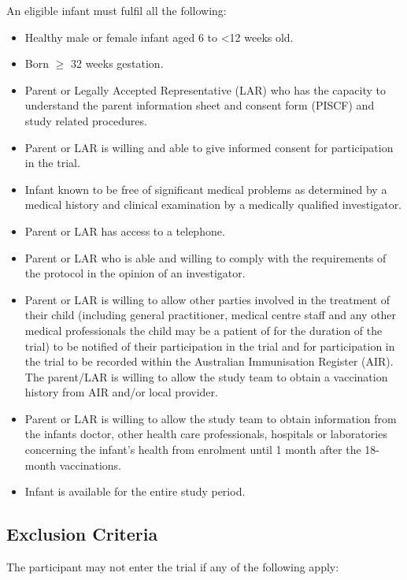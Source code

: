 \documentclass{bmcart}
\begin{document}
An eligible infant must fulfil all the following:

\begin{itemize}
	\item Healthy male or female infant aged 6 to \textless12 weeks old.
	\item Born $\geq$ 32 weeks gestation.
	\item
	Parent or Legally Accepted Representative (LAR) who has the capacity to understand the parent information sheet and consent form (PISCF) and study related procedures.
	\item Parent or LAR is willing and able to give informed consent for participation in the trial.
	\item Infant known to be free of significant medical problems as determined by a medical history and clinical examination by a medically qualified investigator.
	\item Parent or LAR has access to a telephone.
	\item Parent or LAR who is able and willing to comply with the requirements of the protocol in the opinion of an investigator.
	\item Parent or LAR is willing to allow other parties involved in the treatment of their child (including general practitioner, medical centre staff and any other medical professionals the child may be a patient of for the duration of the trial) to be notified of their participation in the trial and for participation in the trial to be recorded within the Australian Immunisation Register (AIR). The parent/LAR is willing to allow the study team to obtain a vaccination history from AIR and/or local provider.
	\item Parent or LAR is willing to allow the study team to obtain information from the infants doctor, other health care professionals, hospitals or laboratories concerning the infant's health from enrolment until 1 month after the 18-month vaccinations.
	\item Infant is available for the entire study period.
\end{itemize}


\subsection*{Exclusion Criteria}

The participant may not enter the trial if any of the following apply:
\end{document}
